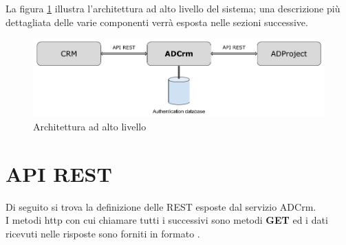 La figura \ref{fig:architetturasistema} illustra l'architettura ad alto livello del sistema; una descrizione più dettagliata delle varie componenti verrà esposta nelle sezioni successive.

\begin{figure}[H]
	\centering
	\includegraphics[width=\linewidth]{images/architettura_sistema}
	\caption{Architettura ad alto livello}
	\label{fig:architetturasistema}
\end{figure}

\section{API REST}\label{apiRest}
Di seguito si trova la definizione delle  REST esposte dal servizio ADCrm.\\
I metodi \gls{http} con cui chiamare tutti i successivi  sono metodi \textbf{GET} ed i dati ricevuti nelle risposte sono forniti in formato .


